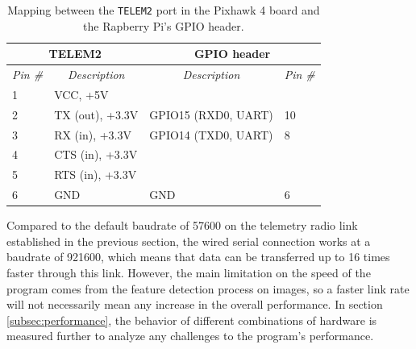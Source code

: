 \begin{table}[]
\centering
\begin{tabular}{|ll||ll|}
\hline
\multicolumn{2}{|c||}{\textbf{TELEM2}}                                             & \multicolumn{2}{c|}{\textbf{GPIO header}}                                        \\ \hline \hline
\multicolumn{1}{|c|}{\textit{Pin \#}} & \multicolumn{1}{c||}{\textit{Description}} & \multicolumn{1}{c|}{\textit{Description}} & \multicolumn{1}{c|}{\textit{Pin \#}} \\ \hline
\multicolumn{1}{|l|}{1}               & VCC, +5V                                  & \multicolumn{1}{l|}{}                     &                                      \\ \hline
\multicolumn{1}{|l|}{2}               & TX (out), +3.3V                           & \multicolumn{1}{l|}{GPIO15 (RXD0, UART)}  & 10                                   \\ \hline
\multicolumn{1}{|l|}{3}               & RX (in), +3.3V                            & \multicolumn{1}{l|}{GPIO14 (TXD0, UART)}  & 8                                    \\ \hline
\multicolumn{1}{|l|}{4}               & CTS (in), +3.3V                           & \multicolumn{1}{l|}{}                     &                                      \\ \hline
\multicolumn{1}{|l|}{5}               & RTS (in), +3.3V                           & \multicolumn{1}{l|}{}                     &                                      \\ \hline
\multicolumn{1}{|l|}{6}               & GND                                       & \multicolumn{1}{l|}{GND}                  & 6                                    \\ \hline
\end{tabular}
\caption{Mapping between the \texttt{TELEM2} port in the Pixhawk 4 board and the Rapberry Pi's GPIO header.}
\label{tab:wiring-telem}
\end{table}

Compared to the default baudrate of 57600 on the telemetry radio link established in the previous section, the wired serial connection works at a baudrate of 921600, which means that data can be transferred up to 16 times faster through this link.
However, the main limitation on the speed of the program comes from the feature detection process on images, so a faster link rate will not necessarily mean any increase in the overall performance.
In section \ref{subsec:performance}, the behavior of different combinations of hardware is measured further to analyze any challenges to the program's performance.


